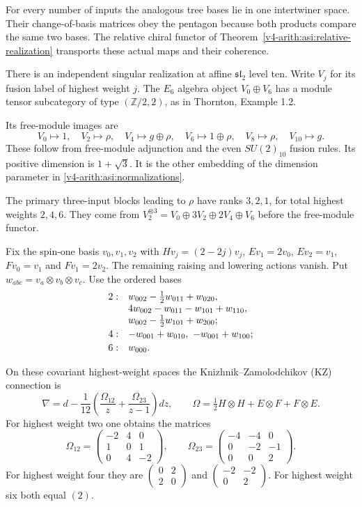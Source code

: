 For every number of inputs the analogous tree bases lie in one
intertwiner space. Their change-of-basis matrices obey the pentagon
because both products compare the same two bases. The relative chiral
functor of Theorem~\ref{v4-arith:asi:relative-realization} transports these
actual maps and their coherence.

There is an independent singular realization at affine $\mathfrak{sl}_2$
level ten. Write $V_j$ for its fusion label of highest weight $j$.
The $E_6$ algebra object $V_0\oplus V_6$ has a module tensor
subcategory of type $(\mathbb Z/2,2)$, as in
Thornton, Example 1.2.

Its free-module images are
\[
 V_0\mapsto1,\quad V_2\mapsto\rho,\quad V_4\mapsto g\oplus\rho,\quad
 V_6\mapsto1\oplus\rho,\quad V_8\mapsto\rho,\quad V_{10}\mapsto g.
\]
These follow from free-module adjunction and the even $SU(2)_{10}$ fusion
rules. Its positive dimension is $1+\sqrt3$. It is the
other embedding of the dimension parameter in
\eqref{v4-arith:asi:normalizations}.

The primary three-input blocks leading to $\rho$ have ranks $3,2,1$,
for total highest weights $2,4,6$. They come from
$V_2^{\otimes3}=V_0\oplus3V_2\oplus2V_4\oplus V_6$ before the free-module
functor.

Fix the spin-one basis $v_0,v_1,v_2$ with
$Hv_j=(2-2j)v_j$, $Ev_1=2v_0$, $Ev_2=v_1$, $Fv_0=v_1$ and
$Fv_1=2v_2$. The remaining raising and lowering actions vanish.
Put $w_{abc}=v_a\otimes v_b\otimes v_c$. Use the ordered bases
\[
\begin{array}{c@{\quad}l}
2:&w_{002}-\frac12w_{011}+w_{020},\\
  &4w_{002}-w_{011}-w_{101}+w_{110},\\
  &w_{002}-\frac12w_{101}+w_{200};\\[2pt]
4:&-w_{001}+w_{010},\ -w_{001}+w_{100};\\[2pt]
6:&w_{000}.
\end{array}
\]

On these covariant highest-weight spaces the Knizhnik--Zamolodchikov
(KZ) connection is
\[
 \nabla=d-\frac1{12}\left(\frac{\Omega_{12}}z+
                     \frac{\Omega_{23}}{z-1}\right)dz,\qquad
 \Omega=\tfrac12H\otimes H+E\otimes F+F\otimes E.
\]
For highest weight two one obtains the matrices
\[
 \Omega_{12}=\begin{pmatrix}-2&4&0\\1&0&1\\0&4&-2\end{pmatrix},\qquad
 \Omega_{23}=\begin{pmatrix}-4&-4&0\\0&-2&-1\\0&0&2\end{pmatrix}.
\]
For highest weight four they are
$\left(\begin{smallmatrix}0&2\\2&0\end{smallmatrix}\right)$ and
$\left(\begin{smallmatrix}-2&-2\\0&2\end{smallmatrix}\right)$.
For highest weight six both equal $(2)$.


